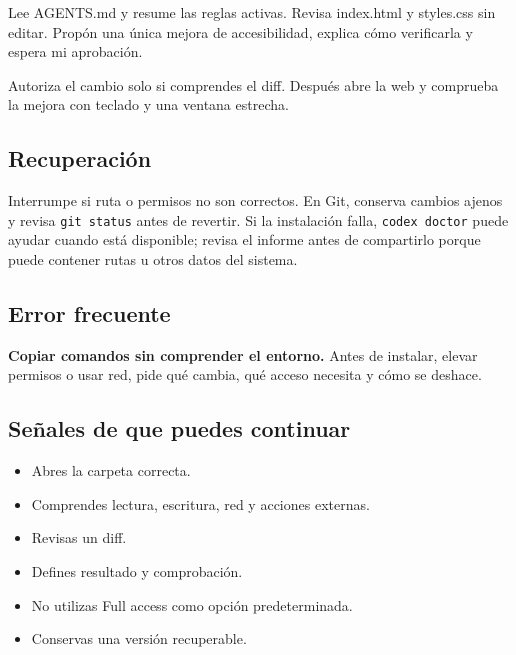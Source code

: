 \documentclass[10pt,a4paper,openany]{book}
\providecommand{\tightlist}{\setlength{\itemsep}{0.18em}\setlength{\parskip}{0pt}}
\newenvironment{Shaded}{}{}
\newcommand{\NormalTok}[1]{#1}
\renewenvironment{Shaded}
  {\begin{tcolorbox}[
    enhanced,
    breakable,
    colback=CodeBg,
    colframe=Border,
    boxrule=0.5pt,
    arc=2mm,
    left=3mm,
    right=3mm,
    top=2.2mm,
    bottom=2.2mm,
    before skip=0.8em,
    after skip=0.9em
  ]}
  {\end{tcolorbox}}
\begin{document}
\begin{Shaded}
\begin{Highlighting}[]
\NormalTok{Lee AGENTS.md y resume las reglas activas. Revisa index.html y styles.css sin}
\NormalTok{editar. Propón una única mejora de accesibilidad, explica cómo verificarla y}
\NormalTok{espera mi aprobación.}
\end{Highlighting}
\end{Shaded}

Autoriza el cambio solo si comprendes el diff. Después abre la web y
comprueba la mejora con teclado y una ventana estrecha.

\subsection{Recuperación}\label{recuperaciuxf3n-16}

Interrumpe si ruta o permisos no son correctos. En Git, conserva cambios
ajenos y revisa \texttt{git\ status} antes de revertir. Si la
instalación falla, \texttt{codex\ doctor} puede ayudar cuando está
disponible; revisa el informe antes de compartirlo porque puede contener
rutas u otros datos del sistema.

\subsection{Error frecuente}\label{error-frecuente-18}

\textbf{Copiar comandos sin comprender el entorno.} Antes de instalar,
elevar permisos o usar red, pide qué cambia, qué acceso necesita y cómo
se deshace.

\subsection{Señales de que puedes
continuar}\label{seuxf1ales-de-que-puedes-continuar}

\begin{itemize}
\tightlist
\item
  Abres la carpeta correcta.
\item
  Comprendes lectura, escritura, red y acciones externas.
\item
  Revisas un diff.
\item
  Defines resultado y comprobación.
\item
  No utilizas Full access como opción predeterminada.
\item
  Conservas una versión recuperable.
\end{itemize}
\end{document}
